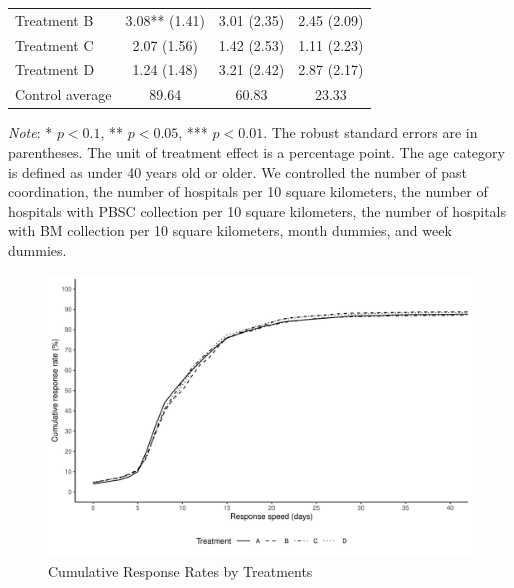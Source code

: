 \documentclass[12pt, a4paper]{article}
\begin{document}
\begin{table}[H]
\begin{threeparttable}
\begin{tabular}[t]{lccc}
\hspace{1em}Treatment B & 3.08** (1.41) & 3.01 (2.35) & 2.45 (2.09)\\
\hspace{1em}Treatment C & 2.07 (1.56) & 1.42 (2.53) & 1.11 (2.23)\\
\hspace{1em}Treatment D & 1.24 (1.48) & 3.21 (2.42) & 2.87 (2.17)\\
\hspace{1em}Control average & 89.64 & 60.83 & 23.33\\
\bottomrule
\end{tabular}
\begin{tablenotes}
\item \emph{Note}: * $p < 0.1$, ** $p < 0.05$, *** $p < 0.01$. The robust standard errors are in parentheses. The unit of treatment effect is a percentage point. The age category is defined as under 40 years old or older. We controlled the number of past coordination, the number of hospitals per 10 square kilometers, the number of hospitals with PBSC collection per 10 square kilometers, the number of hospitals with BM collection per 10 square kilometers, month dummies, and week dummies.
\end{tablenotes}
\end{threeparttable}
\end{table}

\begin{figure}[H]
\includegraphics{JMDP RCT - Main Document_files/figure-latex/cumulative-response-rate-1} \caption{Cumulative Response Rates by Treatments}\label{fig:cumulative-response-rate}
\end{figure}
\end{document}
